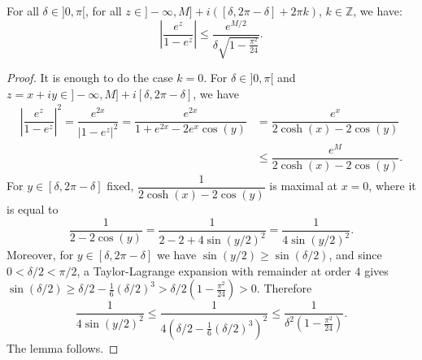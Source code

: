 \documentclass[10pt,a4paper]{amsart}
\newcommand{\mz}{\mathbb{Z}}
\begin{document}
\begin{lem}\label{lem:bound:exp:1-exp}
For all $\delta\in ]0,\pi[$, for all $z \in ]-\infty,M] + i([\delta, 2\pi-\delta]+2\pi k)$, $k\in \mz$, we have:
$$
\left \vert
\dfrac{e^z}{1-e^z}
\right \vert \leq \dfrac{e^{M/2}}{\delta\sqrt{1- \frac{\pi^2}{24}}}.
$$
\end{lem}

\begin{proof} It is enough to do the case $k=0$. For $\delta\in ]0,\pi[$ and $z = x+iy \in ]-\infty,M] + i[\delta, 2\pi-\delta]$, we have
 \begin{align*}
 \left\vert \dfrac{e^z}{1-e^z}
 \right \vert^2 = 
 \dfrac{e^{2x}}{|1-e^z|^2} = 
\dfrac{e^{2x}}{1+e^{2x}-2e^x \cos(y)} & = 
\dfrac{e^{x}}{2\cosh(x)-2\cos(y)} \\ & \leq 
 \dfrac{e^M}{2\cosh(x)-2\cos(y)}.
 \end{align*}
For $y \in [\delta,2\pi-\delta]$ fixed, 
$\dfrac{1}{2\cosh(x)-2\cos(y)}$ is maximal at $x=0$, where it is equal to
$$\dfrac{1}{2-2\cos(y)}
= \dfrac{1}{2-2+4\sin(y/2)^2}
= \dfrac{1}{4 \sin(y/2)^2} .
$$
Moreover, for $y\in [\delta,2\pi-\delta]$ we have $\sin(y/2)\geq \sin(\delta/2)$, and since $0<\delta/2 <\pi/2$, a Taylor-Lagrange expansion with remainder at order $4$ gives $\textstyle \sin(\delta/2) \geq \delta/2 - \frac{1}{6}(\delta/2)^3>\delta/2\left (1-\frac{\pi^2}{24}\right )>0$. Therefore
$$\dfrac{1}{4 \sin(y/2)^2} \leq \dfrac{1}{4(\delta/2 - \frac{1}{6}(\delta/2)^3)^2} \leq \dfrac{1}{\delta^2(1- \frac{\pi^2}{24})}.$$
The lemma follows.
\end{proof}
\end{document}
